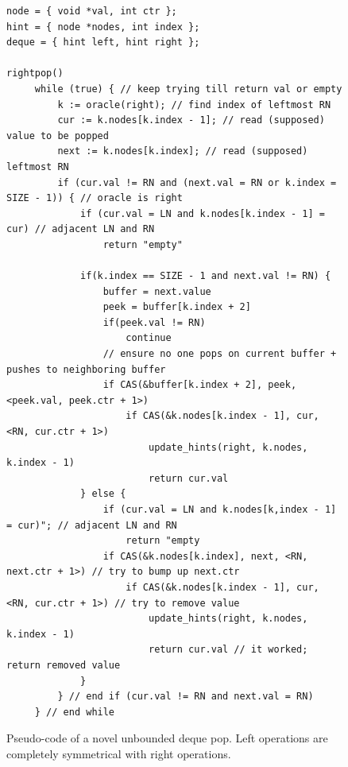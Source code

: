 \documentclass[11pt, letterpaper]{article}
\begin{document}
        \begin{figure}[t!]
            \footnotesize\begin{verbatim}
node = { void *val, int ctr };
hint = { node *nodes, int index };
deque = { hint left, hint right };

rightpop()
     while (true) { // keep trying till return val or empty
         k := oracle(right); // find index of leftmost RN
         cur := k.nodes[k.index - 1]; // read (supposed) value to be popped
         next := k.nodes[k.index]; // read (supposed) leftmost RN
         if (cur.val != RN and (next.val = RN or k.index = SIZE - 1)) { // oracle is right
             if (cur.val = LN and k.nodes[k.index - 1] = cur) // adjacent LN and RN
                 return "empty"

             if(k.index == SIZE - 1 and next.val != RN) { 
                 buffer = next.value
                 peek = buffer[k.index + 2]
                 if(peek.val != RN)
                     continue
                 // ensure no one pops on current buffer + pushes to neighboring buffer
                 if CAS(&buffer[k.index + 2], peek, <peek.val, peek.ctr + 1>)
                     if CAS(&k.nodes[k.index - 1], cur, <RN, cur.ctr + 1>)
                         update_hints(right, k.nodes, k.index - 1)
                         return cur.val
             } else {
                 if (cur.val = LN and k.nodes[k,index - 1] = cur)"; // adjacent LN and RN
                     return "empty
                 if CAS(&k.nodes[k.index], next, <RN, next.ctr + 1>) // try to bump up next.ctr
                     if CAS(&k.nodes[k.index - 1], cur, <RN, cur.ctr + 1>) // try to remove value
                         update_hints(right, k.nodes, k.index - 1)
                         return cur.val // it worked; return removed value
             }
         } // end if (cur.val != RN and next.val = RN)
     } // end while
            \end{verbatim}
            \caption{Pseudo-code of a novel unbounded deque pop. Left operations are completely symmetrical with right operations.}
            \label{code::unbounded-pop}
        \end{figure}
\end{document}
